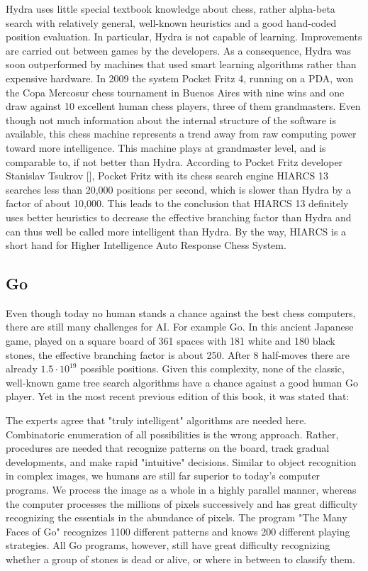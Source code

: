 \documentclass[10pt]{book}
\begin{document}
Hydra uses little special textbook knowledge about chess, rather alpha-beta search with relatively general, well-known heuristics and a good hand-coded
position evaluation. In particular, Hydra is not capable of learning. Improvements are carried out between games by the developers. As a consequence, Hydra was soon outperformed by machines that used smart learning algorithms rather than expensive hardware.
In 2009 the system Pocket Fritz 4, running on a PDA, won the Copa Mercosur chess tournament in Buenos Aires with nine wins and one draw against 10 excellent human chess players, three of them grandmasters. Even though not much information about the internal structure of the software is available, this chess machine represents a trend away from raw computing power toward more intelligence. This machine plays at grandmaster level, and is comparable to, if not better than Hydra. According to Pocket Fritz developer Stanislav Tsukrov [\cite{wikipedia2013}], Pocket Fritz with its chess search engine HIARCS 13 searches less than 20,000 positions per second, which is slower than Hydra by a factor of about 10,000. This leads to the conclusion that HIARCS 13 definitely uses better heuristics to decrease the effective branching factor than Hydra and can thus well be called more intelligent than Hydra. By the way, HIARCS is a short hand for Higher Intelligence Auto Response Chess System.

\subsection{Go}
Even though today no human stands a chance against the best chess computers, there are still many challenges for AI. For example Go. In this ancient Japanese game, played on a square board of 361 spaces with 181 white and 180 black stones, the effective branching factor is about 250. After 8 half-moves there are already $1.5 \cdot 10^{19}$ possible positions. Given this complexity, none of the classic, well-known game tree search algorithms have a chance against a good human Go player. Yet in the most recent previous edition of this book, it was stated that:

\begin{displayquote}
The experts agree that "truly intelligent" algorithms are needed here. Combinatoric enumeration of all possibilities is the wrong approach. Rather, procedures are needed that recognize patterns on the board, track gradual developments, and make rapid "intuitive" decisions. Similar to object recognition in complex images, we humans are still far superior to today's computer programs. We process the image as a whole in a highly parallel manner, whereas the computer processes the millions of pixels successively and has great difficulty recognizing the essentials in the abundance of pixels. The program "The Many Faces of Go" recognizes 1100 different patterns and knows 200 different playing strategies. All Go programs, however, still have great difficulty recognizing whether a group of stones is dead or alive, or where in between to classify them.
\end{displayquote}
\end{document}
